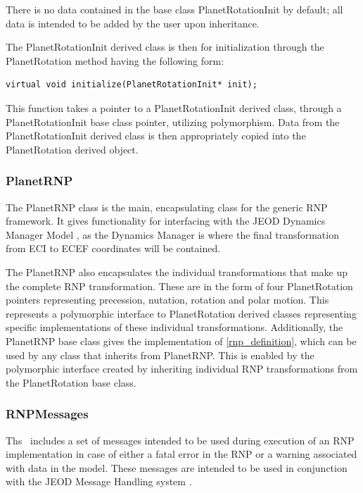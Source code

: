 There is no data contained in the base class PlanetRotationInit by default; 
all data is intended to be added by the user upon inheritance. 

The PlanetRotationInit derived class is then for initialization through the
PlanetRotation method having the following form:

\begin{verbatim}
virtual void initialize(PlanetRotationInit* init);
\end{verbatim}

This function takes a pointer to a PlanetRotationInit derived class, through
a PlanetRotationInit base class pointer, utilizing polymorphism. Data from
the PlanetRotationInit derived class is then appropriately copied into
the PlanetRotation derived object.

\subsubsection{PlanetRNP}

The PlanetRNP class is the main, encapsulating class for the generic RNP
framework. It gives functionality for interfacing with the JEOD Dynamics Manager
Model \cite{dynenv:DYNMANAGER}, as the Dynamics Manager is where the final
transformation from ECI to ECEF coordinates will be contained.

The PlanetRNP also encapsulates the individual transformations that make up
the complete RNP transformation. These are
in the form of four PlanetRotation pointers
representing precession, nutation, rotation and polar motion. This represents
a polymorphic interface to PlanetRotation derived classes representing
specific implementations of these individual transformations. Additionally,
the PlanetRNP base class gives the implementation of \eqref{rnp_definition},
which can be used by any class that inherits from PlanetRNP. This is
enabled by the polymorphic interface created by inheriting individual
RNP transformations from the PlanetRotation base class.

\subsubsection{RNPMessages}

Ths \ModelDesc\ includes a set of messages intended to be used during execution
of an RNP implementation in case of either a fatal error in the RNP or
a warning associated with data in the model. These messages are intended to be
used in conjunction with the JEOD Message Handling system \cite{dynenv:MESSAGE}.

